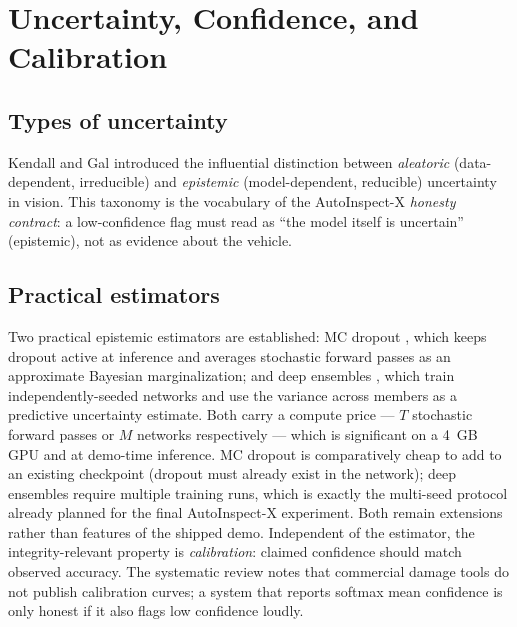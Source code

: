 \documentclass[conference]{IEEEtran}
\begin{document}
\section{Uncertainty, Confidence, and Calibration}
\label{sec:uncertainty}
\subsection{Types of uncertainty}
Kendall and Gal \cite{kendall2017} introduced the influential distinction
between \emph{aleatoric} (data-dependent, irreducible) and \emph{epistemic}
(model-dependent, reducible) uncertainty in vision. This taxonomy is the
vocabulary of the AutoInspect-X \emph{honesty contract}: a low-confidence flag
must read as ``the model itself is uncertain'' (epistemic), not as evidence
about the vehicle.

\subsection{Practical estimators}
Two practical epistemic estimators are established: MC dropout \cite{mcdropout2016},
which keeps dropout active at inference and averages stochastic forward passes
as an approximate Bayesian marginalization; and deep ensembles
\cite{deepensembles2017}, which train independently-seeded networks and use the
variance across members as a predictive uncertainty estimate. Both carry a
compute price --- $T$ stochastic forward passes or $M$ networks respectively ---
which is significant on a 4~GB GPU and at demo-time inference. MC dropout is
comparatively cheap to add to an existing checkpoint (dropout must already exist
in the network); deep ensembles require multiple training runs, which is exactly
the multi-seed protocol already planned for the final AutoInspect-X experiment.
Both remain extensions rather than features of the shipped demo. Independent of
the estimator, the integrity-relevant property is \emph{calibration}: claimed
confidence should match observed accuracy. The systematic review
\cite{hasan2025} notes that commercial damage tools do not publish calibration
curves; a system that reports softmax mean confidence is only honest if it also
flags low confidence loudly.
\end{document}
